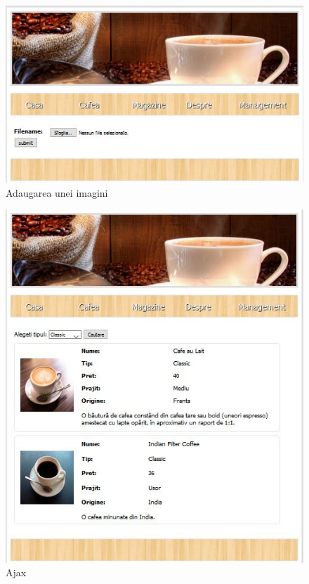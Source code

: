 \begin{figure}[!ht]
	
	\centering
	
	\includegraphics[width=1.0\textwidth]{Cattura6.JPG}
	
	\caption{Adaugarea unei imagini}
	
	\label{Im_label}
	
\end{figure}

\begin{figure}[!ht]
	
	\centering
	
	\includegraphics[width=1.0\textwidth]{Cattura7.JPG}
	
	\caption{Ajax}
	
	\label{Im_label}
	
\end{figure}

\clearpage